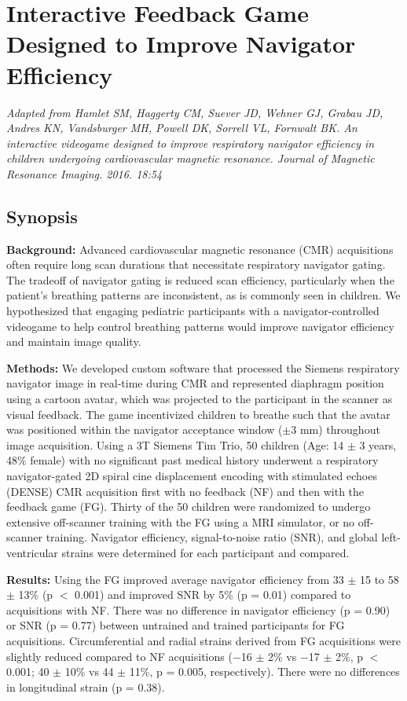 \chapter{Interactive Feedback Game Designed to Improve Navigator Efficiency}

\begin{center}
	\textit{Adapted from Hamlet SM, Haggerty CM, Suever JD, Wehner GJ, Grabau JD, Andres KN, Vandsburger MH, Powell DK, Sorrell VL, Fornwalt BK. An interactive videogame designed to improve respiratory navigator efficiency in children undergoing cardiovascular magnetic resonance. Journal of Magnetic Resonance Imaging. 2016. 18:54}
\end{center}

\section{Synopsis}
	\noindent \textbf{Background:} Advanced cardiovascular magnetic resonance (CMR) acquisitions often require long scan durations that necessitate respiratory navigator gating. The tradeoff of navigator gating is reduced scan efficiency, particularly when the patient's breathing patterns are inconsistent, as is commonly seen in children. We hypothesized that engaging pediatric participants with a navigator-controlled videogame to help control breathing patterns would improve navigator efficiency and maintain image quality.
	
	\noindent \textbf{Methods:} We developed custom software that processed the Siemens respiratory navigator image in real-time during CMR and represented diaphragm position using a cartoon avatar, which was projected to the participant in the scanner as visual feedback. The game incentivized children to breathe such that the avatar was positioned within the navigator acceptance window ($\pm$3 mm) throughout image acquisition. Using a 3T Siemens Tim Trio, 50 children (Age: 14 $\pm$ 3 years, 48\% female) with no significant past medical history underwent a respiratory navigator-gated 2D spiral cine displacement encoding with stimulated echoes (DENSE) CMR acquisition first with no feedback (NF) and then with the feedback game (FG). Thirty of the 50 children were randomized to undergo extensive off-scanner training with the FG using a MRI simulator, or no off-scanner training. Navigator efficiency, signal-to-noise ratio (SNR), and global left-ventricular strains were determined for each participant and compared.
	
	\noindent \textbf{Results:} Using the FG improved average navigator efficiency from 33 $\pm$ 15 to 58 $\pm$ 13\% (p $<$ 0.001) and improved SNR by 5\% (p = 0.01) compared to acquisitions with NF. There was no difference in navigator efficiency (p = 0.90) or SNR (p = 0.77) between untrained and trained participants for FG acquisitions. Circumferential and radial strains derived from FG acquisitions were slightly reduced compared to NF acquisitions (−16 $\pm$ 2\% vs −17 $\pm$ 2\%, p $<$ 0.001; 40 $\pm$ 10\% vs 44 $\pm$ 11\%, p = 0.005, respectively). There were no differences in longitudinal strain (p = 0.38).
	
